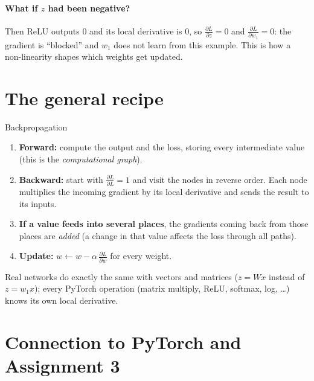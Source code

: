 \documentclass[11pt,a4paper]{article}
\newcommand{\pd}[2]{\frac{\partial #1}{\partial #2}}
\begin{document}
\paragraph{What if $z$ had been negative?} Then ReLU outputs 0 and its local derivative is 0, so $\pd{L}{z}=0$ and $\pd{L}{w_1}=0$: the gradient is \enquote{blocked} and $w_1$ does not learn from this example. This is how a non-linearity shapes which weights get updated.

\section{The general recipe}

\begin{keybox}{Backpropagation}
\begin{enumerate}[nosep,leftmargin=*]
  \item \textbf{Forward:} compute the output and the loss, storing every intermediate value (this is the \emph{computational graph}).
  \item \textbf{Backward:} start with $\pd{L}{L}=1$ and visit the nodes in reverse order. Each node multiplies the incoming gradient by its local derivative and sends the result to its inputs.
  \item \textbf{If a value feeds into several places}, the gradients coming back from those places are \emph{added} (a change in that value affects the loss through all paths).
  \item \textbf{Update:} $w\gets w-\alpha\,\pd{L}{w}$ for every weight.
\end{enumerate}
\end{keybox}
Real networks do exactly the same with vectors and matrices ($z=Wx$ instead of $z=w_1x$); every PyTorch operation (matrix multiply, ReLU, softmax, log, \dots) knows its own local derivative.

\section{Connection to PyTorch and Assignment 3}
\end{document}
